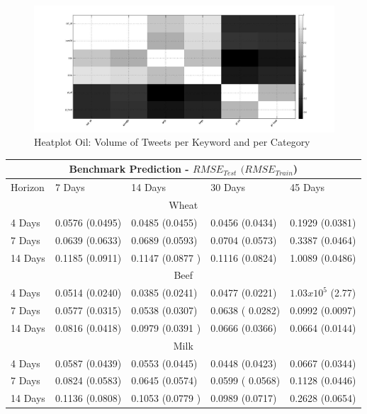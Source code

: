 \begin{figure}[H]
        \centering
         \includegraphics[width=1\textwidth ]{img/anal/black_oil}
              
        \caption{Heatplot Oil: Volume of Tweets per Keyword and per Category}
        \label{fig:oil_heat}
\end{figure}




\begin{tabular}{ |p{3cm}||p{3cm}|p{3cm}|p{3cm}| p{3cm}|  }
 \hline
 \multicolumn{5}{|c|}{Benchmark Prediction - $RMSE_{Test}$ $(RMSE_{Train}$) } \\
 \hline
 Horizon & 7 Days & 14 Days & 30 Days  & 45 Days  \\

 \hline
  \multicolumn{5}{|c|}{Wheat} \\
  \hline
 4 Days & 0.0576  (0.0495)  & 0.0485 (0.0455)   & 0.0456 (0.0434) & 0.1929  (0.0381) \\
 7 Days &0.0639 (0.0633) & 0.0689 (0.0593) &   0.0704 (0.0573) & 0.3387  (0.0464)\\
 14 Days & 0.1185 (0.0911)  & 0.1147  (0.0877 ) & 0.1116 (0.0824) & 1.0089 (0.0486)  \\
 \hline
  \multicolumn{5}{|c|}{Beef} \\
  \hline
   4 Days & 0.0514 (0.0240)  & 0.0385 (0.0241)   & 0.0477 (0.0221) & $1.03 x 10^5$ (2.77) \\
 7 Days & 0.0577 (0.0315) & 0.0538 (0.0307) &   0.0638 ( 0.0282) & 0.0992  (0.0097)\\
 14 Days & 0.0816 (0.0418)  & 0.0979  (0.0391 ) & 0.0666 (0.0366) & 0.0664 (0.0144)  \\
   \hline
  \multicolumn{5}{|c|}{Milk} \\
  \hline
    4 Days & 0.0587 (0.0439)  &  0.0553 (0.0445)   & 0.0448 (0.0423) & 0.0667  (0.0344) \\
 7 Days & 0.0824 (0.0583) &  0.0645 (0.0574) &   0.0599 ( 0.0568) & 0.1128  (0.0446)\\
 14 Days & 0.1136  (0.0808)  & 0.1053  (0.0779 ) & 0.0989 (0.0717) & 0.2628 (0.0654)  \\
  
 \hline
\end{tabular}


